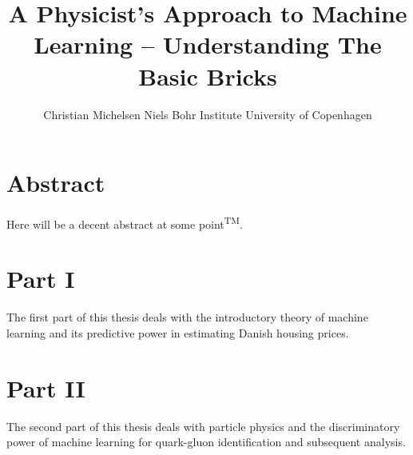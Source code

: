 \documentclass[a4paper, twoside, nobib]{tufte-book}
\title[A Physicist's Approach To Machine Learning -- Understanding The Basic Bricks]{A Physicist's \newline \noindent 
       Approach to \newline \noindent 
       Machine Learning \newline \noindent
       --  \newline \noindent
       Understanding  \newline \noindent
       The Basic Bricks}
\author[Christian Michelsen]{\newline \noindent 
        Christian Michelsen \newline \noindent 
        Niels Bohr Institute \newline \noindent 
        University of Copenhagen \newline }
\begin{document}
\maketitle



\tableofcontents

\listoffigures

\listoftables


\cleardoublepage


\chapter{Abstract}

Here will be a decent abstract at some point\textsuperscript{TM}.

\mainmatter





\chapter*{Part I}
The first part of this thesis deals with the introductory theory of machine learning and its predictive power in estimating Danish housing prices.






\chapter*{Part II}
The second part of this thesis deals with particle physics and the discriminatory power of machine learning for quark-gluon identification and subsequent analysis. 
\end{document}
